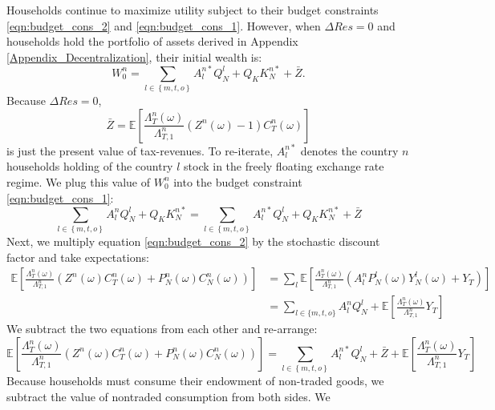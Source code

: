 Households continue to maximize utility subject to their budget
constraints \eqref{eqn:budget_cons_2} and \eqref{eqn:budget_cons_1}.
However, when $\Delta Res = 0$ and households hold the portfolio of
assets derived in Appendix \ref{Appendix_Decentralization}, their
initial wealth is:
\begin{equation*}
  W^n_0
  = \sum_{l \in \left\{ m, t, o \right\}} A^{n \ast}_l Q^l_N
  + Q_K K^{n \ast}_N + \bar{Z}. 
\end{equation*}
Because $\Delta Res = 0$,
\begin{equation*}
  \bar{Z} = \mathbb{E}\left[
    \frac{\Lambda^n_T(\omega)}{\Lambda^n_{T, 1}}
    \left( Z^n(\omega) - 1 \right) C^n_T(\omega)
  \right] 
\end{equation*}
is just the present value of tax-revenues. To re-iterate,
$A^{n \ast}_l$ denotes the country $n$ households holding of the
country $l$ stock in the freely floating exchange rate regime. We plug
this value of $W^n_0$ into the budget constraint
\eqref{eqn:budget_cons_1}:
\begin{equation*}
  \sum_{l \in \left\{ m, t, o \right\}} A^n_l Q^l_N
  + Q_K K^{n \ast}_N
  = \sum_{l \in \left\{ m, t, o \right\}} A^{n \ast}_l Q^l_N
  + Q_K K^{n \ast}_N + \bar{Z}
\end{equation*}
Next, we multiply equation \eqref{eqn:budget_cons_2} by the stochastic
discount factor and take expectations:
\begin{align*}
  \mathbb{E}\left[
  \frac{\Lambda^n_T(\omega)}{\Lambda^n_{T, 1}}
  \left( Z^n(\omega) C^n_T(\omega) 
  + P^n_N(\omega) C^n_N(\omega) \right) \right]
  & = \sum_l \mathbb{E}\left[
    \frac{\Lambda^n_T(\omega)}{\Lambda^n_{T, 1}}
    \left( A^n_l P^l_N(\omega) Y^l_N(\omega)
    + Y_T \right) \right] \\
  & = \sum_{l \in \{m, t, o\}} A^n_l  Q^l_N
    + \mathbb{E}\left[
    \frac{\Lambda^n_T(\omega)}{\Lambda^n_{T, 1}} Y_T
    \right] 
\end{align*}
We subtract the two equations from each other and re-arrange:
\begin{equation*}
  \mathbb{E}\left[
    \frac{\Lambda^n_T(\omega)}{\Lambda^n_{T, 1}}
    \left( Z^n(\omega) C^n_T(\omega) 
      + P^n_N(\omega) C^n_N(\omega) \right) \right]
  = \sum_{l \in \left\{ m, t, o \right\}} A^{n \ast}_l Q^l_N
  + \bar{Z} + \mathbb{E}\left[
    \frac{\Lambda^n_T(\omega)}{\Lambda^n_{T, 1}} Y_T
  \right]
\end{equation*}
Because households must consume their endowment of non-traded goods,
we subtract the value of nontraded consumption from both sides. We
